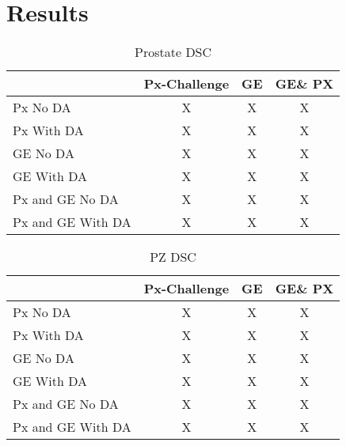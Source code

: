 \section{Results}

\begin{table}
    \centering
    \begin{tabular}{|l|c|c|c|}
        \hline
         & Px-Challenge & GE & GE\& PX \\
         \hline
         Px No DA & X & X & X \\
         Px With DA & X & X & X \\
         \hline
         GE No DA & X & X & X \\
         GE With DA & X & X & X \\
         \hline
         Px and GE No DA & X & X & X \\
         Px and GE With DA & X & X & X \\
         \hline
    \end{tabular}
    \caption{Prostate DSC}
    \label{tab:res_prost}
\end{table}


\begin{table}
    \centering
    \begin{tabular}{|l|c|c|c|}
        \hline
         & Px-Challenge & GE & GE\& PX \\
         \hline
         Px No DA & X & X & X \\
         Px With DA & X & X & X \\
         \hline
         GE No DA & X & X & X \\
         GE With DA & X & X & X \\
         \hline
         Px and GE No DA & X & X & X \\
         Px and GE With DA & X & X & X \\
         \hline
    \end{tabular}
    \caption{PZ DSC}
    \label{tab:res_pz}
\end{table}
